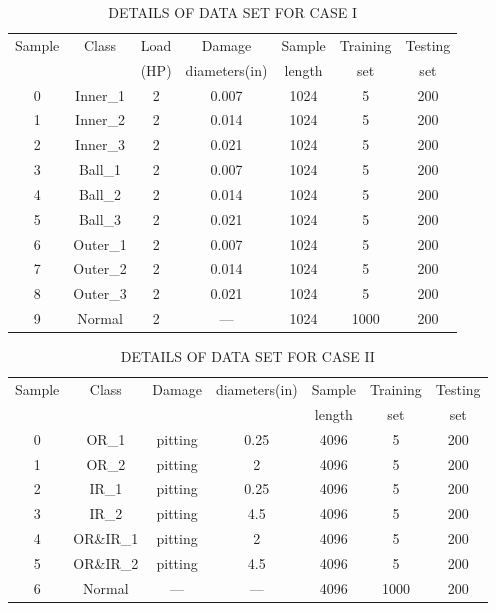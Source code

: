 \documentclass[conference,twocolumn]{IEEEtran}
\begin{document}
\begin{table}[htbp]
\centering
\caption{DETAILS OF DATA SET FOR CASE I}
\label{tab:dataset_caseI}
\begin{tabular}{ccccccc}
\toprule
Sample & Class & Load & Damage & Sample & Training & Testing \\
 & & (HP) & diameters(in) & length & set & set \\
\toprule
0 & Inner\_1 & 2 & 0.007 & 1024 & 5 & 200 \\
1 & Inner\_2 & 2 & 0.014 & 1024 & 5 & 200 \\
2 & Inner\_3 & 2 & 0.021 & 1024 & 5 & 200 \\
3 & Ball\_1 & 2 & 0.007 & 1024 & 5 & 200 \\
4 & Ball\_2 & 2 & 0.014 & 1024 & 5 & 200 \\
5 & Ball\_3 & 2 & 0.021 & 1024 & 5 & 200 \\
6 & Outer\_1 & 2 & 0.007 & 1024 & 5 & 200 \\
7 & Outer\_2 & 2 & 0.014 & 1024 & 5 & 200 \\
8 & Outer\_3 & 2 & 0.021 & 1024 & 5 & 200 \\
9 & Normal & 2 & --- & 1024 & 1000 & 200 \\
\toprule
\end{tabular}
\end{table}

\begin{table}[htbp]
\centering
\caption{DETAILS OF DATA SET FOR CASE II}
\label{tab:dataset_caseII}
\begin{tabular}{ccccccc}
\toprule
Sample & Class & Damage & diameters(in) & Sample & Training & Testing \\
 & & & & length & set & set \\
\toprule
0 & OR\_1 & pitting & 0.25 & 4096 & 5 & 200 \\
1 & OR\_2 & pitting & 2 & 4096 & 5 & 200 \\
2 & IR\_1 & pitting & 0.25 & 4096 & 5 & 200 \\
3 & IR\_2 & pitting & 4.5 & 4096 & 5 & 200 \\
4 & OR\&IR\_1 & pitting & 2 & 4096 & 5 & 200 \\
5 & OR\&IR\_2 & pitting & 4.5 & 4096 & 5 & 200 \\
6 & Normal & --- & --- & 4096 & 1000 & 200 \\
\toprule
\end{tabular}
\end{table}
\end{document}
